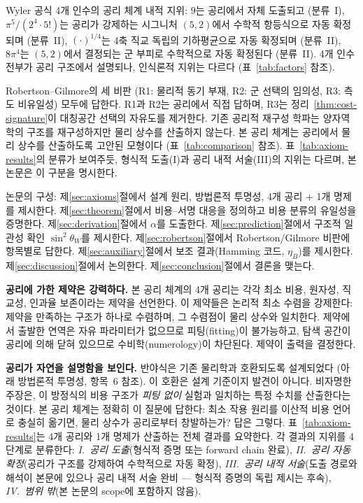 \documentclass[entropy,article,submit,pdftex,oneauthor]{Definitions/mdpi}
\begin{document}
Wyler 공식 4개 인수의 공리 체계 내적 지위: $9$는 공리에서 자체 도출되고 (분류~I), $\pi^5/(2^4 \cdot 5!)$는 공리가 강제하는 시그니처 $(5,2)$에서 수학적 항등식으로 자동 확정되며 (분류~II), $(\cdot)^{1/4}$는 4축 직교 독립의 기하평균으로 자동 확정되며 (분류~II), $8\pi^4$는 $(5,2)$에서 결정되는 군 부피로 수학적으로 자동 확정된다 (분류~II). 4개 인수 전부가 공리 구조에서 설명되나, 인식론적 지위는 다르다 (표~\ref{tab:factors} 참조).

Robertson--Gilmore의 세 비판 (R1: 물리적 동기 부재, R2: 군 선택의 임의성, R3: 측도 비유일성) 모두에 답한다. R1과 R2는 공리에서 직접 답하며, R3는 정리~\ref{thm:cost-signature}이 대칭공간 선택의 자유도를 제거한다. 기존 공리적 재구성 학파는 양자역학의 구조를 재구성하지만 물리 상수를 산출하지 않는다. 본 공리 체계는 공리에서 물리 상수를 산출하도록 고안된 모형이다 (표~\ref{tab:comparison} 참조). 표~\ref{tab:axiom-results}의 분류가 보여주듯, 형식적 도출(I)과 공리 내적 서술(III)의 지위는 다르며, 본 논문은 이 구분을 명시한다.

논문의 구성: 제\ref{sec:axioms}절에서 설계 원리, 방법론적 투명성, 4개 공리 + 1개 명제를 제시한다. 제\ref{sec:theorem}절에서 비용--서명 대응을 정의하고 비용 분류의 유일성을 증명한다. 제\ref{sec:derivation}절에서 $\alpha$를 도출한다. 제\ref{sec:prediction}절에서 구조적 일관성 확인 $\sin^2\theta_W$를 제시한다. 제\ref{sec:robertson}절에서 Robertson/Gilmore 비판에 항목별로 답한다. 제\ref{sec:auxiliary}절에서 보조 결과(Hamming 코드, $\eta_B$)를 제시한다. 제\ref{sec:discussion}절에서 논의한다. 제\ref{sec:conclusion}절에서 결론을 맺는다.


\textbf{공리에 가한 제약은 강력하다.} 본 공리 체계의 4개 공리는 각각 최소 비용, 원자성, 직교성, 인과율 보존이라는 제약을 선언한다. 이 제약들은 논리적 최소 수렴을 강제한다: 제약을 만족하는 구조가 하나로 수렴하며, 그 수렴점이 물리 상수와 일치한다. 제약에서 출발한 연역은 자유 파라미터가 없으므로 피팅(fitting)이 불가능하고, 탐색 공간이 공리에 의해 닫혀 있으므로 수비학(numerology)이 차단된다. 제약이 출력을 결정한다.

\textbf{공리가 자연을 설명함을 보인다.} 반야식은 기존 물리학과 호환되도록 설계되었다 (아래 방법론적 투명성, 항목~6 참조). 이 호환은 설계 기준이지 발견이 아니다. 비자명한 주장은, 이 방정식의 비용 구조가 \emph{피팅 없이} 실험과 일치하는 특정 수치를 산출한다는 것이다. 본 공리 체계는 정확히 이 질문에 답한다: 최소 작용 원리를 이산적 비용 언어로 충실히 옮기면, 물리 상수가 공리로부터 창발하는가? 답은 그렇다. 표~\ref{tab:axiom-results}는 4개 공리와 1개 명제가 산출하는 전체 결과를 요약한다. 각 결과의 지위를 4단계로 분류한다: \emph{I.~공리 도출}(형식적 증명 또는 forward chain 완료), \emph{II.~공리 자동 확정}(공리가 구조를 강제하여 수학적으로 자동 확정), \emph{III.~공리 내적 서술}(도출 경로와 해석이 본문에 있으나 공리 내적 서술 완비 --- 형식적 증명의 독립 제시는 후속), \emph{IV.~범위 밖}(본 논문의 scope에 포함하지 않음).
\end{document}
